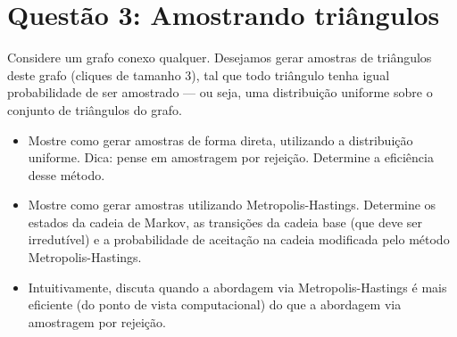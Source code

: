 \section*{Questão 3: Amostrando triângulos}

Considere um grafo conexo qualquer. Desejamos gerar amostras de triângulos deste grafo (cliques de tamanho 3), tal que todo triângulo tenha igual probabilidade de ser amostrado — ou seja, uma distribuição uniforme sobre o conjunto de triângulos do grafo.

\begin{itemize}
  \item Mostre como gerar amostras de forma direta, utilizando a distribuição uniforme. Dica: pense em amostragem por rejeição. Determine a eficiência desse método.
  \begin{resposta}
  \end{resposta}
  \item Mostre como gerar amostras utilizando Metropolis-Hastings. Determine os estados da cadeia de Markov, as transições da cadeia base (que deve ser irredutível) e a probabilidade de aceitação na cadeia modificada pelo método Metropolis-Hastings.
  \begin{resposta}
  \end{resposta}
  \item Intuitivamente, discuta quando a abordagem via Metropolis-Hastings é mais eficiente (do ponto de vista computacional) do que a abordagem via amostragem por rejeição.
  \begin{resposta}
  \end{resposta}
\end{itemize}

